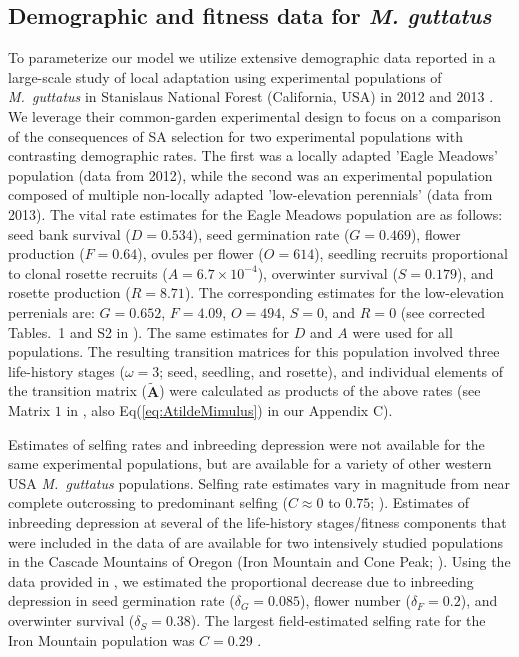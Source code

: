 \documentclass[11pt]{article}
\def\mbf#1{\mathbf{#1}}
\begin{document}
\subsection*{Demographic and fitness data for {\itshape M. guttatus}} \label{subsec:MguttMethods}
To parameterize our model we utilize extensive demographic data reported in a large-scale study of local adaptation using experimental populations of {\itshape M.~guttatus} in Stanislaus National Forest (California, USA) in 2012 and 2013 \citep{PetersonEtAl2016}. We leverage their common-garden experimental design to focus on a comparison of the consequences of SA selection for two experimental populations with contrasting demographic rates. The first was a locally adapted 'Eagle Meadows' population (data from 2012), while the second was an experimental population composed of multiple non-locally adapted 'low-elevation perennials' (data from 2013). The vital rate estimates for the Eagle Meadows population are as follows: seed bank survival ($D = 0.534$), seed germination rate ($G = 0.469$), flower production ($F = 0.64$), ovules per flower ($O = 614$), seedling recruits proportional to clonal rosette recruits ($A = 6.7 \times 10^{-4}$), overwinter survival ($S = 0.179$), and rosette production ($R = 8.71$). The corresponding estimates for the low-elevation perrenials are: $G = 0.652$, $F = 4.09$, $O = 494$, $S = 0$, and $R = 0$ (see corrected Tables.~1 and S2 in \citealt{PetersonEtAl2017}). The same estimates for $D$ and $A$ were used for all populations. The resulting transition matrices for this population involved three life-history stages ($\omega = 3$; seed, seedling, and rosette), and individual elements of the transition matrix ($\tilde{\mbf{A}}$) were calculated as products of the above rates (see Matrix $1$ in \citealt{PetersonEtAl2016}, also Eq(\ref{eq:AtildeMimulus}) in our Appendix C).

Estimates of selfing rates and inbreeding depression were not available for the same experimental populations, but are available for a variety of other western USA {\itshape M.~guttatus} populations. Selfing rate estimates vary in magnitude from near complete outcrossing to predominant selfing ($C \approx 0$ to $0.75$; \citealt{RitlandGanders1987, Ritland1990, Willis1999b}). Estimates of inbreeding depression at several of the life-history stages/fitness components that were included in the data of \citet{PetersonEtAl2016} are available for two intensively studied populations in the Cascade Mountains of Oregon (Iron Mountain and Cone Peak; \citealt{Willis1993, Willis1999a, Willis1999b}). Using the data provided in \citet{Willis1993}, we estimated the proportional decrease due to inbreeding depression in seed germination rate ($\delta_{G} = 0.085$), flower number ($\delta_{F} = 0.2$), and overwinter survival ($\delta_{S} = 0.38$). The largest field-estimated selfing rate for the Iron Mountain population was $C = 0.29$ \citep{Willis1993}.
\end{document}
